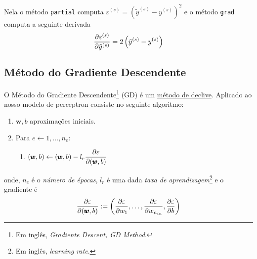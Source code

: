 \ifispython

\fi

Nela o método \lstinline+partial+ computa $\varepsilon^{(s)} = \left(\tilde{y}^{(s)}-y^{(s)}\right)^2$ e o método \lstinline+grad+ computa a seguinte derivada
\begin{equation}
  \frac{\partial\varepsilon^{(s)}}{\partial \tilde{y}^{(s)}} = 2\left(\tilde{y}^{(s)}-y^{(s)}\right)
\end{equation}

\subsection{Método do Gradiente Descendente}

O Método do Gradiente Descendente\footnote{Em inglês, {\it Gradiente Descent, GD Method}.} (GD) é um \href{https://notaspedrok.com.br/notas/MatematicaNumericaAvancada/cap_otimizacao_sec_minimi.html}{método de declive}. Aplicado ao nosso modelo de perceptron consiste no seguinte algoritmo:
\begin{enumerate}
\item $\pmb{w}, b$ aproximações iniciais.
\item Para $e\leftarrow 1, \dotsc, n_e$:
  \begin{enumerate}
  \item $\displaystyle (\pmb{w}, b) \leftarrow (\pmb{w}, b) - l_r\frac{\partial\varepsilon}{\partial (\pmb{w}, b)}$
  \end{enumerate}
\end{enumerate}
onde, $n_e$ é o \emph{número de épocas}, $l_r$ é uma dada \emph{taxa de aprendizagem}\footnote{Em inglês, {\it learning rate}.} e o gradiente é
\begin{equation}
  \frac{\partial\varepsilon}{\partial (\pmb{w}, b)} := \left(\frac{\partial\varepsilon}{\partial w_1}, \dotsc, \frac{\partial\varepsilon}{\partial w_{n_{in}}}, \frac{\partial\varepsilon}{\partial b}\right)
\end{equation}


